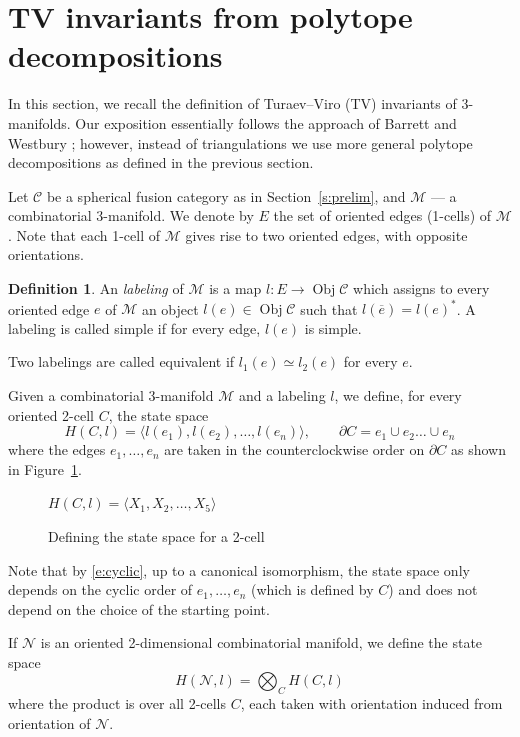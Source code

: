 \documentclass{amsart}
\theoremstyle{definition}
\newtheorem{definition}[theorem]{Definition}
\theoremstyle{remark}
\numberwithin{equation}{section}
\newcommand{\firef}[1]{Figure~{\rm\ref{#1}}}
\newcommand{\seref}[1]{Section~{\rm\ref{#1}}}
\newcommand{\ov}{\overline}
\newcommand{\del}{\partial}
\newcommand{\<}{\langle}
\renewcommand{\>}{\rangle}
\newcommand{\N}{\mathcal{N}}       %
\newcommand{\C}{\mathcal{C}}      %
\newcommand{\M}{\mathcal{M}}      %
\DeclareMathOperator{\Obj}{Obj}
\begin{document}
\section{TV invariants from polytope decompositions}\label{s:TV}

In this section, we recall the definition of Turaev--Viro (TV) invariants
of 3-manifolds. Our exposition essentially follows the approach of
Barrett and Westbury ; however, instead of triangulations we
use more general polytope decompositions as defined in the previous
section. 



Let $\C$ be a spherical fusion category as in \seref{s:prelim}, and $\M$
--- a combinatorial 3-manifold. We denote by $E$ the set of oriented edges
(1-cells) of $\M$. Note that each 1-cell of $\M$ gives rise to two oriented
edges, with opposite orientations. 

\begin{definition}\label{e:labeling}
 An  {\em labeling} of $\M$ is a map $l\colon E\to \Obj \C$ which assigns
  to every oriented edge $e$ of $\M$ an object $l(e)\in \Obj \C$ such that
  $l(\ov{e})=l(e)^*$. A labeling is called simple if for every edge,
  $l(e)$ is simple.  
 
  Two labelings are called equivalent if $l_1(e)\simeq l_2(e)$ for every
  $e$. 
\end{definition}

Given a combinatorial 3-manifold $\M$ and a labeling $l$, we
define, for every oriented 2-cell $C$, the state space
\begin{equation}\label{e:H(C)}
 H(C,l)=\<l(e_1), l(e_2),\dots, l(e_n)\>,\qquad 
 \del C=e_1\cup e_2\dots\cup e_n
\end{equation}
where the edges $e_1,\dots, e_n$ are taken in the counterclockwise order on
$\del C$ as shown in \firef{f:state_space1}.
  \begin{figure}[ht]
  \tzStateSpaceI
  \hspace{1.5cm} $H(C,l)=\<X_1,X_2,\dots, X_5\>$
  \caption{Defining the state space for a 2-cell}\label{f:state_space1}
  \end{figure}


Note that by \eqref{e:cyclic}, up to a canonical isomorphism, the state
space only depends  on the cyclic order of $e_1,\dots, e_n$ (which is
defined by $C$) and does not  depend on the choice of the starting point.

If $\N$ is an oriented 2-dimensional combinatorial manifold, we define the
state space
$$
H(\N,l)=\bigotimes_C H(C,l)
$$
where the product is over all 2-cells $C$, each taken with 
orientation induced from orientation of $\N$. 
\end{document}
